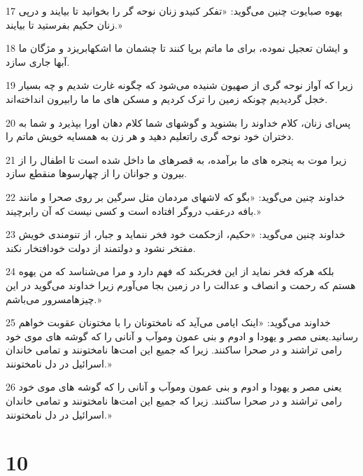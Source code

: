\par 17 یهوه صبایوت چنین می‌گوید: «تفکر کنیدو زنان نوحه گر را بخوانید تا بیایند و در‌پی زنان حکیم بفرستید تا بیایند.»
\par 18 و ایشان تعجیل نموده، برای ما ماتم برپا کنند تا چشمان ما اشکهابریزد و مژگان ما آبها جاری سازد.
\par 19 زیرا که آواز نوحه گری از صهیون شنیده می‌شود که چگونه غارت شدیم و چه بسیار خجل گردیدیم چونکه زمین را ترک کردیم و مسکن های ما ما رابیرون انداخته‌اند.
\par 20 پس‌ای زنان، کلام خداوند را بشنوید و گوشهای شما کلام دهان اورا بپذیرد و شما به دختران خود نوحه گری راتعلیم دهید و هر زن به همسایه خویش ماتم را.
\par 21 زیرا موت به پنجره های ما برآمده، به قصرهای ما داخل شده است تا اطفال را از بیرون و جوانان را از چهارسوها منقطع سازد.
\par 22 خداوند چنین می‌گوید: «بگو که لاشهای مردمان مثل سرگین بر روی صحرا و مانند بافه درعقب دروگر افتاده است و کسی نیست که آن رابرچیند.»
\par 23 خداوند چنین می‌گوید: «حکیم، ازحکمت خود فخر ننماید و جبار، از تنومندی خویش مفتخر نشود و دولتمند از دولت خودافتخار نکند.
\par 24 بلکه هر‌که فخر نماید از این فخربکند که فهم دارد و مرا می‌شناسد که من یهوه هستم که رحمت و انصاف و عدالت را در زمین بجا می‌آورم زیرا خداوند می‌گوید در این چیزهامسرور می‌باشم.»
\par 25 خداوند می‌گوید: «اینک ایامی می‌آید که نامختونان را با مختونان عقوبت خواهم رسانید.یعنی مصر و یهودا و ادوم و بنی عمون وموآب و آنانی را که گوشه های موی خود رامی تراشند و در صحرا ساکنند. زیرا که جمیع این امت‌ها نامختونند و تمامی خاندان اسرائیل در دل نامختونند.»
\par 26 یعنی مصر و یهودا و ادوم و بنی عمون وموآب و آنانی را که گوشه های موی خود رامی تراشند و در صحرا ساکنند. زیرا که جمیع این امت‌ها نامختونند و تمامی خاندان اسرائیل در دل نامختونند.»
 
\chapter{10}

